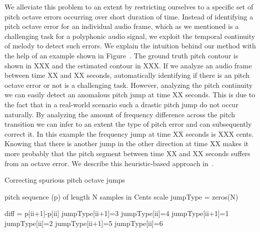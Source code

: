 {{We alleviate this problem to an extent by restricting ourselves to a specific set of pitch octave errors occurring over short duration of time. Instead of identifying a pitch octave error for an individual audio frame, which as we mentioned is a challenging task for a polyphonic audio signal, we exploit the temporal continuity of melody to detect such errors. We explain the intuition behind our method with the help of an example shown in Figure~. The ground truth pitch contour is shown in XXX and the estimated contour in XXX. If we analyze an audio frame between time XX and XX seconds, automatically identifying if there is an pitch octave error or not is a challenging task. However, analyzing the pitch continuity we can easily detect an anomalous pitch jump at time XX seconds. This is due to the fact that in a real-world scenario such a drastic pitch jump do not occur naturally. By analyzing the amount of frequency difference across the pitch transition we can infer to an extent the type of pitch error and can subsequently correct it. In this example the frequency jump at time XX seconds is XXX cents. Knowing that there is another jump in the other direction at time XX makes it more probably that the pitch segment between time XX and XX seconds suffers from an octave error. We describe this heuristic-based approach in~.

\renewcommand{\algorithmiccomment}[1]{\bgroup\hfill\tiny//~#1\egroup}

\begin{algorithm}
	\caption{Correcting spurious pitch octave jumps}
	\label{alg:algorithmPitchCorrection}
	\begin{algorithmic}  
		 pitch sequence (p) of length N samples in Cents scale
		\State jumpType = zeros(N)	

									
			\State diff = p[ii+1]-p[ii]
					\State jumpType[ii+1]=3			
					\State jumpType[ii]=4			
				\EndIf
					\State jumpType[ii+1]=1			
					\State jumpType[ii]=2			
					\State jumpType[ii+1]=5			
				\Else
					\State jumpType[ii]=6			
				\EndIf
			\EndIf
		\EndFor


\end{algorithmic}
\end{algorithm}}}
